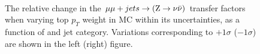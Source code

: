 \begin{figure}[!h]
  \centering
   ~~
  \\

  \caption{\label{fig:tfSyst_topPt_mumuToZinv} The relative change in
  the $\mu\mu + jets \rightarrow ({\text Z} \rightarrow \nu\bar{\nu})$ transfer
  factors when varying top $p_{T}$ weight in MC within its uncertainties, as a function of \scalht and jet category. 
  Variations corresponding to $+1\sigma$ ($-1\sigma$) are shown in the left (right) figure. 
  }
\end{figure}

